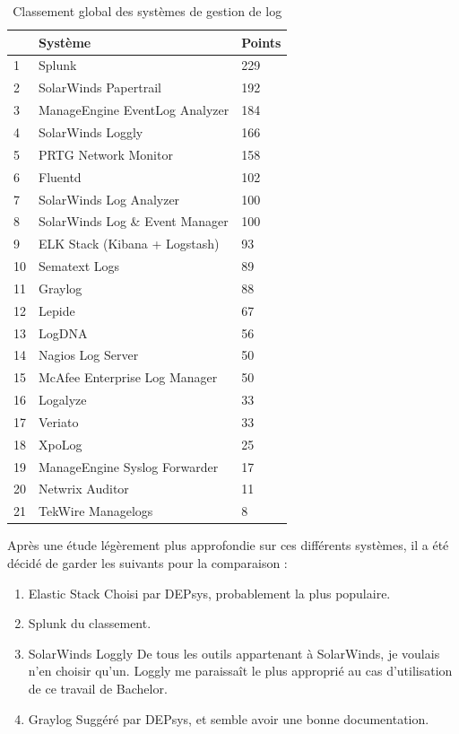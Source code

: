 \documentclass[paper=a4, fontsize=11pt]{scrartcl}
\begin{document}
\begin{table}[H]
\centering
\begin{tabular}{ |p{2cm}|p{6cm}|p{1cm}| } 
    \hline
     & Système & Points\\
    \hline
    1 & Splunk & 229\\
    2 & SolarWinds Papertrail & 192\\
    3 & ManageEngine EventLog Analyzer & 184\\
    4 & SolarWinds Loggly & 166\\
    5 & PRTG Network Monitor & 158\\
    6 & Fluentd & 102\\
    7 & SolarWinds Log Analyzer & 100\\
    8 & SolarWinds Log \& Event Manager & 100\\
    9 & ELK Stack (Kibana + Logstash)  & 93\\
    10 & Sematext Logs & 89\\
    11 & Graylog & 88\\
    12 & Lepide & 67\\
    13 & LogDNA & 56\\
    14 & Nagios Log Server & 50\\
    15 & McAfee Enterprise Log Manager & 50\\
    16 & Logalyze & 33\\
    17 & Veriato & 33\\
    18 & XpoLog & 25\\
    19 & ManageEngine Syslog Forwarder & 17\\
    20 & Netwrix Auditor & 11\\
    21 & TekWire Managelogs & 8\\
    \hline
\end{tabular}
\caption{Classement global des systèmes de gestion de log}
\label{t-classementGlobal}
\end{table}
\justify

Après une étude légèrement plus approfondie sur ces différents systèmes, il a été décidé de garder les suivants pour la comparaison :

\begin{enumerate}
    \item Elastic Stack \cite{noauthor_recherche_nodate}
    \subitem Choisi par DEPsys, probablement la plus populaire.
    \item Splunk \cite{noauthor_siem_nodate}
     du classement.
    \item SolarWinds Loggly \cite{noauthor_log_nodate}
    \subitem De tous les outils appartenant à SolarWinds, je voulais n'en choisir qu'un. Loggly me paraissaît le plus approprié au cas d'utilisation de ce travail de Bachelor.
    \item Graylog \cite{noauthor_industry_nodate}
    \subitem Suggéré par DEPsys, et semble avoir une bonne documentation.
\end{enumerate}
\end{document}

